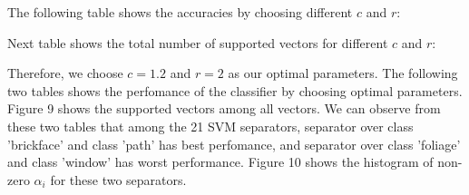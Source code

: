 \documentclass{article}
\begin{document}
The following table shows the accuracies by choosing different $c$ and $r$:


Next table shows the total number of supported vectors for different $c$ and $r$:


Therefore, we choose $c=1.2$ and $r=2$ as our optimal parameters. The following two tables shows the perfomance of the classifier by choosing optimal parameters. Figure 9 shows the supported vectors among all vectors. We can observe from these two tables that among the 21 SVM separators, separator over class 'brickface' and class 'path' has best perfomance, and separator over class 'foliage' and class 'window' has worst performance. Figure 10 shows the histogram of non-zero $\alpha_{i}$ for these two separators. 
\end{document}

